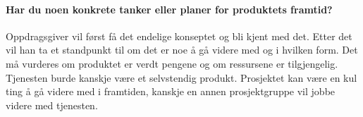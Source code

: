 \paragraph{Har du noen konkrete tanker eller planer for produktets framtid?}
Oppdragsgiver vil først få det endelige konseptet og bli kjent med det. Etter det vil han ta et standpunkt til om det er noe å gå videre med og i hvilken form. Det må vurderes om produktet er verdt pengene og om ressursene er tilgjengelig. Tjenesten burde kanskje være et selvstendig produkt. Prosjektet kan være en kul ting å gå videre med i framtiden, kanskje en annen prosjektgruppe vil jobbe videre med tjenesten.



